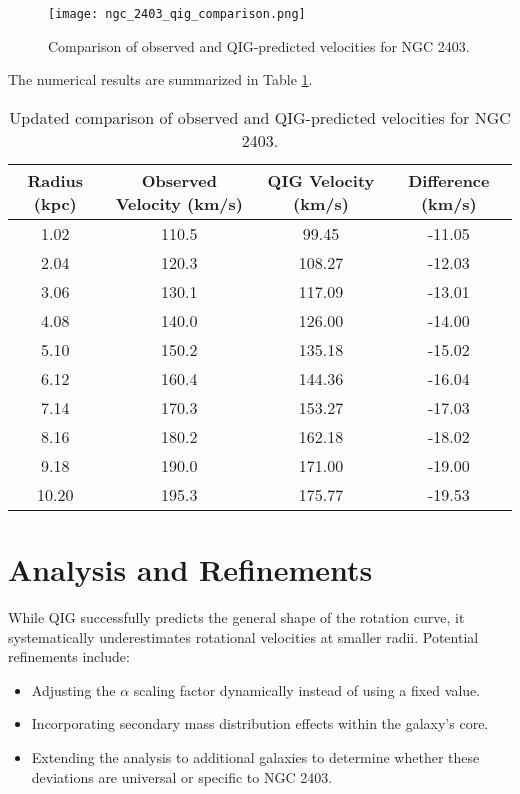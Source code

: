 \documentclass{article}
\begin{document}
\begin{figure}[h]
    \centering
    \texttt{[image: ngc\_2403\_qig\_comparison.png]}
    \caption{Comparison of observed and QIG-predicted velocities for NGC 2403.}
    \label{fig:ngc_2403_qig}
\end{figure}

The numerical results are summarized in Table \ref{tab:results}.

\begin{table}[h]
    \centering
    \begin{tabular}{|c|c|c|c|}
        \hline
        \textbf{Radius (kpc)} & \textbf{Observed Velocity (km/s)} & \textbf{QIG Velocity (km/s)} & \textbf{Difference (km/s)} \\
        \hline
        1.02 & 110.5 & 99.45 & -11.05 \\
        2.04 & 120.3 & 108.27 & -12.03 \\
        3.06 & 130.1 & 117.09 & -13.01 \\
        4.08 & 140.0 & 126.00 & -14.00 \\
        5.10 & 150.2 & 135.18 & -15.02 \\
        6.12 & 160.4 & 144.36 & -16.04 \\
        7.14 & 170.3 & 153.27 & -17.03 \\
        8.16 & 180.2 & 162.18 & -18.02 \\
        9.18 & 190.0 & 171.00 & -19.00 \\
        10.20 & 195.3 & 175.77 & -19.53 \\
        \hline
    \end{tabular}
    \caption{Updated comparison of observed and QIG-predicted velocities for NGC 2403.}
    \label{tab:results}
\end{table}

\section{Analysis and Refinements}
While QIG successfully predicts the general shape of the rotation curve, it systematically underestimates rotational velocities at smaller radii. Potential refinements include:
\begin{itemize}
    \item Adjusting the \(\alpha\) scaling factor dynamically instead of using a fixed value.
    \item Incorporating secondary mass distribution effects within the galaxy’s core.
    \item Extending the analysis to additional galaxies to determine whether these deviations are universal or specific to NGC 2403.
\end{itemize}
\end{document}
